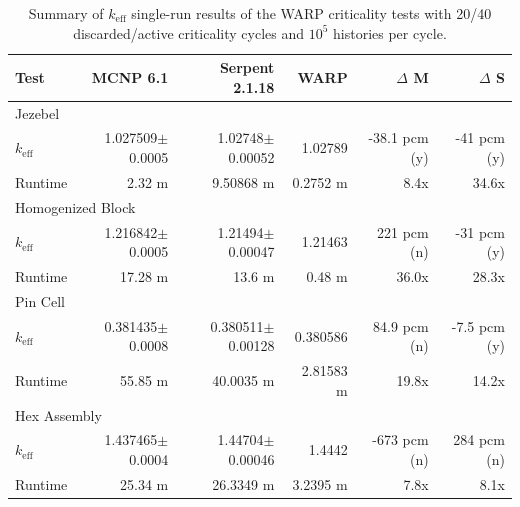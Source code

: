 \begin{table}[h]
\centering
\caption{Summary of $k_\mathrm{eff}$ single-run results of the WARP criticality tests with 20/40 discarded/active criticality cycles and $10^5$ histories per cycle.}
\label{test_summary_5}
\small
\begin{tabular}{| l | r | r | r | r | r |}
 \hline
 Test & MCNP 6.1 & Serpent 2.1.18 & WARP & $\Delta$ M & $\Delta$ S  \\
\hline
\hline
\multicolumn{6}{|l|}{Jezebel}  \\
\hline
 $k_\mathrm{eff}$ & 1.027509$\pm$0.0005 & 1.02748$\pm$0.00052 & 1.02789 & -38.1 pcm (y) & -41 pcm (y) \\
 \hline
 Runtime               & 2.32 m & 9.50868 m & 0.2752 m & 8.4x  & 34.6x  \\
 \hline
 \hline
\multicolumn{6}{|l|}{Homogenized Block }\\
\hline
 $k_\mathrm{eff}$ & 1.216842$\pm$0.0005 & 1.21494$\pm$0.00047 & 1.21463 & 221 pcm (n)  & -31 pcm  (y) \\
 \hline
 Runtime               &  17.28 m & 13.6 m & 0.48 m & 36.0x  & 28.3x  \\
 \hline
  \hline
\multicolumn{6}{|l|}{Pin Cell}\\
\hline
 $k_\mathrm{eff}$ & 0.381435$\pm$0.0008 &  0.380511$\pm$0.00128 & 0.380586 & 84.9 pcm (n)&  -7.5 pcm (y)    \\
 \hline
 Runtime               & 55.85 m & 40.0035 m &  2.81583 m &  19.8x & 14.2x  \\
 \hline
  \hline
\multicolumn{6}{|l|}{Hex Assembly}\\
\hline
 $k_\mathrm{eff}$ & 1.437465$\pm$0.0004 & 1.44704$\pm$0.00046 & 1.4442 & -673 pcm (n) & 284 pcm (n) \\
 \hline
 Runtime               & 25.34 m &  26.3349 m &  3.2395 m  & 7.8x & 8.1x  \\
 \hline
\end{tabular}
\end{table}



